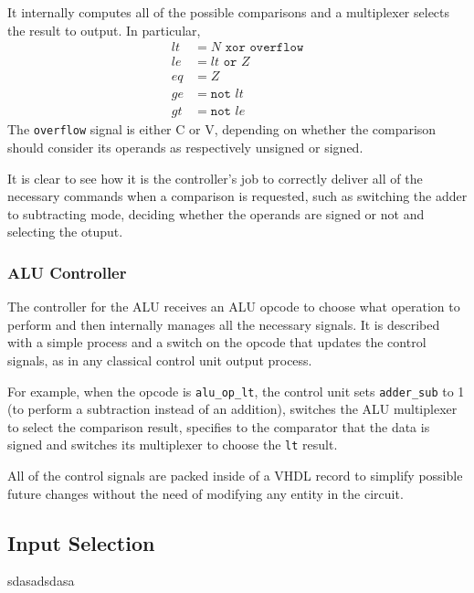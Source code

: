 It internally computes all of the possible comparisons and a multiplexer selects the result to output. In particular,
\begin{align*}
    lt &= N \texttt{ xor } \texttt{overflow} \\
    le &= lt \texttt{ or } Z \\
    eq &= Z \\
    ge &= \texttt{not } lt \\
    gt &= \texttt{not } le
\end{align*}
The \texttt{overflow} signal is either C or V, depending on whether the comparison should consider its operands as
respectively unsigned or signed.

It is clear to see how it is the controller's job to correctly deliver all of the necessary commands when a comparison
is requested, such as switching the adder to subtracting mode, deciding whether the operands are signed or not and
selecting the otuput.

\subsubsection{ALU Controller}
The controller for the ALU receives an ALU opcode to choose what operation to perform and then internally manages all
the necessary signals. It is described with a simple process and a switch on the opcode that updates the control
signals, as in any classical control unit output process.

For example, when the opcode is \texttt{alu\_op\_lt}, the control unit sets \texttt{adder\_sub} to 1 (to perform a
subtraction instead of an addition), switches the ALU multiplexer to select the comparison result, specifies to the
comparator that the data is signed and switches its multiplexer to choose the \texttt{lt} result.

All of the control signals are packed inside of a VHDL record to simplify possible future changes without the need of
modifying any entity in the circuit.

\subsection{Input Selection}
sdasadsdasa

